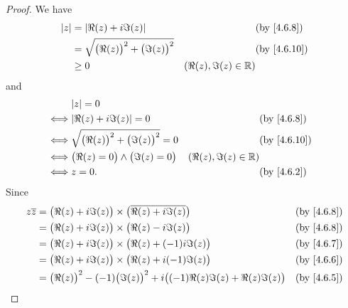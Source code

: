 \begin{proof}
  We have
  \begin{align*}
    \abs{z} & = \abs{\Re(z) + i \Im(z)}                        &                         & \by{4.6.8}                \\
            & = \sqrt{\big(\Re(z)\big)^2 + \big(\Im(z)\big)^2} &                         & \text{(by \cref{4.6.10})} \\
            & \geq 0                                           & (\Re(z), \Im(z) \in \R)
  \end{align*}
  and
  \begin{align*}
         & \abs{z} = 0                                                                                              \\
    \iff & \abs{\Re(z) + i \Im(z)} = 0                        &                         & \by{4.6.8}                \\
    \iff & \sqrt{\big(\Re(z)\big)^2 + \big(\Im(z)\big)^2} = 0 &                         & \text{(by \cref{4.6.10})} \\
    \iff & \big(\Re(z) = 0\big) \land \big(\Im(z) = 0\big)    & (\Re(z), \Im(z) \in \R)                             \\
    \iff & z = 0.                                             &                         & \by{4.6.2}
  \end{align*}
  Since
  \begin{align*}
    z \overline{z} & = \big(\Re(z) + i \Im(z)\big) \times \big(\overline{\Re(z) + i \Im(z)}\big)                     &                                         & \by{4.6.8}                \\
                   & = \big(\Re(z) + i \Im(z)\big) \times \big(\Re(z) - i \Im(z)\big)                                &                                         & \by{4.6.8}                \\
                   & = \big(\Re(z) + i \Im(z)\big) \times \big(\Re(z) + (-1) i \Im(z)\big)                           &                                         & \by{4.6.7}                \\
                   & = \big(\Re(z) + i \Im(z)\big) \times \big(\Re(z) + i (-1) \Im(z)\big)                           &                                         & \by{4.6.6}                \\
                   & = \big(\Re(z)\big)^2 - (-1) \big(\Im(z)\big)^2 + i \big((-1) \Re(z) \Im(z) + \Re(z) \Im(z)\big) &                                         & \by{4.6.5}                \\

\end{align*}
\end{proof}
